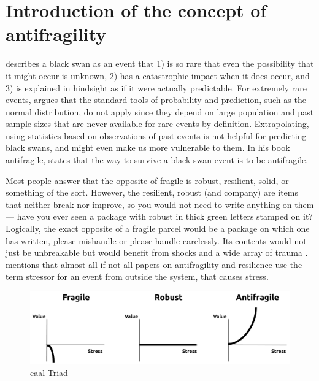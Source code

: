 \section{Introduction of the concept of antifragility}
\label{sec:introantifragility}
\textcite{Taleb2008} describes a black swan as an event that 1) is so rare that even the possibility that it might occur is unknown, 2) has a catastrophic impact when it does occur, and 3) is explained in hindsight as if it were actually predictable. For extremely rare events, \citeauthor{Taleb2008} argues that the standard tools of probability and prediction, such as the normal distribution, do not apply since they depend on large population and past sample sizes that are never available for rare events by definition. Extrapolating, using statistics based on observations of past events is not helpful for predicting black swans, and might even make us more vulnerable to them. In his book \Gls{antifragile}, \textcite{Taleb2012} states that the way to survive a black swan event is to be \gls{antifragile}.

Most people answer that the opposite of \gls{fragile} is \gls{robust}, \gls{resilient}, solid, or something of the sort. However, the \gls{resilient}, \gls{robust} (and company) are items that neither break nor improve, so you would not need to write anything on them — have you ever seen a package with \gls{robust} in thick green letters stamped on it? Logically, the exact opposite of a \gls{fragile} parcel would be a package on which one has written, please mishandle or please handle carelessly. Its contents would not just be unbreakable but would benefit from shocks and a wide array of trauma \parencite{Taleb2012}. \textcite[p. 32]{Botjes2020} mentions that almost all if not all papers on antifragility and resilience use the term stressor for an event
from outside the system, that causes stress. 

\begin{figure}[h!]
	\centering
	\includegraphics[width=0.7\linewidth]{images/eaal-triad}
	\caption[EAAL Triad]{\acrfull{eaal} Triad \parencite{Botjes2020}}
	\label{fig:eaal-triad}
\end{figure}

